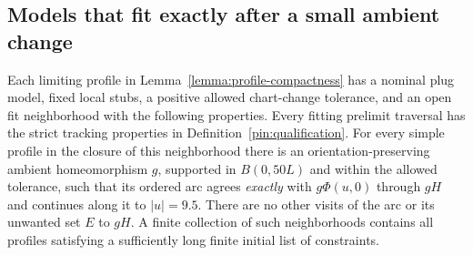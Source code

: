 \subsection{Models that fit exactly after a small ambient change}

\begin{lemma}\label{lemma:exact-fit}
Each limiting profile in Lemma~\ref{lemma:profile-compactness} has a
nominal plug model, fixed local stubs, a positive allowed chart-change
tolerance, and an open fit neighborhood with the following properties.
Every fitting prelimit traversal has the strict tracking properties in
Definition~\ref{pin:qualification}.  For every simple profile in the
closure of this neighborhood there is an orientation-preserving ambient
homeomorphism $g$, supported in $B(0,50L)$ and within the allowed
tolerance, such that its ordered arc agrees \emph{exactly} with
$g\Phi(u,0)$ through $gH$ and continues along it to $|u|=9.5$.
There are no other visits of the arc or its unwanted set $E$ to $gH$.
A finite collection of such neighborhoods contains all profiles
satisfying a sufficiently long finite initial list of constraints.
\end{lemma}

